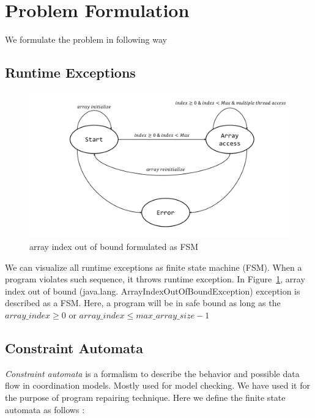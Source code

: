 
\section{Problem Formulation}
\label{sec:form}


We formulate the problem in following way

\subsection{Runtime Exceptions}
\label{subsec:excep}

\begin{figure}[htb]
\centering
\includegraphics[scale = .25]{images/ArrayIndex.pdf}
\caption{array index out of bound formulated as FSM}
\label{fig:array}
\end{figure}


We can visualize all runtime exceptions as finite state machine (FSM). When a
program violates such sequence, it throws runtime exception. 
In Figure~\ref{fig:array}, array index out of bound (java.lang.
ArrayIndexOutOfBoundException) exception is described as a FSM. 
Here, a program will be in safe bound as long as the $array\_index \geq 0$ or
$array\_index \leq max\_array\_size - 1$

\subsection{Constraint Automata}
\label{subsec:constraintAutomata}

\emph{Constraint automata} is a formalism to describe the behavior and possible
data flow in coordination models. 
Mostly used for model checking. We have used it for the purpose of program
repairing technique. Here we define the finite state automata as follows :

